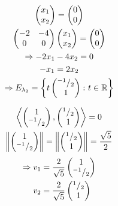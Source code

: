 \begin{enumerate}
\begin{itemize}
\begin{gather}
\begin{pmatrix}
x_1\\x_2
\end{pmatrix}
=
\begin{pmatrix}
0\\0
\end{pmatrix}\\
\begin{pmatrix}
-2 & -4\\
0 & 0
\end{pmatrix}
\begin{pmatrix}
x_1\\x_2
\end{pmatrix}
=
\begin{pmatrix}
0\\0
\end{pmatrix}\\
\Rightarrow -2x_1 -4x_2 =0\\
-x_1 = 2x_2\\
\Rightarrow E_{\lambda_2} = \left\{
t\begin{pmatrix}
^{-1}/_{2}\\1
\end{pmatrix}
\colon t \in \mathbb{R}
\right\}
\end{gather}
\end{itemize}
\begin{gather}
\left\langle\begin{pmatrix}1\\^{-1}/_{2} \end{pmatrix}, 
\begin{pmatrix}^{1}/_{2}\\1\end{pmatrix}\right\rangle=0\\
\left\lVert\begin{pmatrix}1\\^{-1}/_{2} \end{pmatrix}\right\rVert =
\left\lVert\begin{pmatrix}^{1}/_{2}\\1\end{pmatrix}\right\rVert = \frac{\sqrt{5}}{2}
\end{gather}
\begin{align}
\implies v_1 &=
\frac{2}{\sqrt{5}}\begin{pmatrix}1\\\mfrac{-1}{2} \end{pmatrix}\\
v_2 & = \frac{2}{\sqrt{5}}\begin{pmatrix}\mfrac{1}{2}\\1\end{pmatrix}

\end{align}
\end{enumerate}
